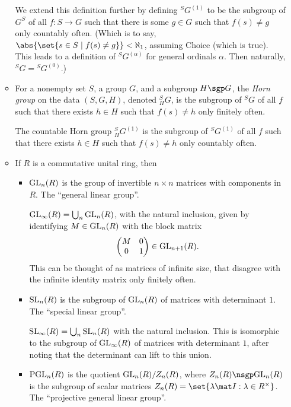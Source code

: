 \documentclass[a4paper,12pt]{article}
\begin{document}
\begin{enumerate}[leftmargin=*]
\begin{itemize}
    We extend this definition further by defining
    \({}^SG^{(1)}\) to be the subgroup of \(G^S\) of all \(f: S \to G\) such
    that there is some \(g \in G\) such that \(f(s) \ne g\) only countably
    often.
    (Which is to say, \(\abs{\set{s \in S \mid f(s) \ne g}} < \aleph_1\),
    assuming Choice (which is true). This leads to a definition of
    \({}^SG^{(\alpha)}\) for general ordinals \(\alpha\). Then naturally,
    \({}^SG = {}^SG^{(0)}\).)
   \item
    For a nonempty set \(S\), a group \(G\), and a subgroup \(H \sgp G\), the
    \emph{Horn group} on the data \((S, G, H)\), denoted
    \({}_H^S G\), is the subgroup of \({}^S G\) of all \(f\) such that there
    exists \(h \in H\) such that \(f(s) \ne h\) only finitely often.

    The countable Horn group \({}_H^S G^{(1)}\) is the subgroup of
    \({}^S G^{(1)}\) of all \(f\) such that there exists \(h \in H\) such that
    \(f(s) \ne h\) only countably often.
   \item
    If \(R\) is a commutative unital ring, then
    \begin{itemize}
     \item
      \(\mathrm{GL}_n(R)\) is the group of invertible \(n \times n\) matrices
      with components in \(R\). The ``general linear group''.

      \(\mathrm{GL}_\infty(R) = \bigcup_n \mathrm{GL}_n(R)\), with the natural
      inclusion, given by identifying \(M \in \mathrm{GL}_n(R)\) with the block matrix
      \begin{equation*}
       \begin{pmatrix}
        M & 0 \\
        0 & 1 \\
       \end{pmatrix} \in \mathrm{GL}_{n + 1}(R).
      \end{equation*}
      This can be thought of as matrices of infinite size, that disagree with
      the infinite identity matrix only finitely often.
     \item
      \(\mathrm{SL}_n(R)\) is the subgroup of \(\mathrm{GL}_n(R)\) of matrices
      with determinant \(1\). The ``special linear group''.

      \(\mathrm{SL}_\infty(R) = \bigcup_n \mathrm{SL}_n(R)\) with the natural
      inclusion. This is isomorphic to the subgroup of
      \(\mathrm{GL}_\infty(R)\) of matrices with determinant \(1\), after
      noting that the determinant can lift to this union.
     \item
      \(\mathrm{PGL}_n(R)\) is the quotient
      \(\mathrm{GL}_n(R) / Z_n(R)\), where \(Z_n(R) \nsgp \GL_n(R)\) is the
      subgroup of scalar matrices
      \(Z_n(R) = \set{\lambda \mat I: \lambda \in R^\times}\).
      The ``projective general linear group''.


\end{itemize}
\end{itemize}
\end{enumerate}
\end{document}

